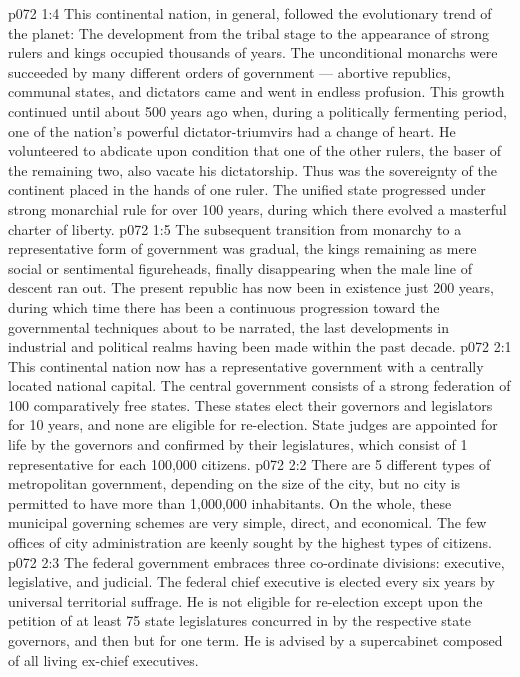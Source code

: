 \vs p072 1:4 \pc This continental nation, in general, followed the evolutionary trend of the planet: The development from the tribal stage to the appearance of strong rulers and kings occupied thousands of years. The unconditional monarchs were succeeded by many different orders of government --- abortive republics, communal states, and dictators came and went in endless profusion. This growth continued until about 500 years ago when, during a politically fermenting period, one of the nation’s powerful dictator\hyp{}triumvirs had a change of heart. He volunteered to abdicate upon condition that one of the other rulers, the baser of the remaining two, also vacate his dictatorship. Thus was the sovereignty of the continent placed in the hands of one ruler. The unified state progressed under strong monarchial rule for over 100 years, during which there evolved a masterful charter of liberty.
\vs p072 1:5 The subsequent transition from monarchy to a representative form of government was gradual, the kings remaining as mere social or sentimental figureheads, finally disappearing when the male line of descent ran out. The present republic has now been in existence just 200 years, during which time there has been a continuous progression toward the governmental techniques about to be narrated, the last developments in industrial and political realms having been made within the past decade.
\vs p072 2:1 This continental nation now has a representative government with a centrally located national capital. The central government consists of a strong federation of 100 comparatively free states. These states elect their governors and legislators for 10 years, and none are eligible for re\hyp{}election. State judges are appointed for life by the governors and confirmed by their legislatures, which consist of 1 representative for each 100,000 citizens.
\vs p072 2:2 There are 5 different types of metropolitan government, depending on the size of the city, but no city is permitted to have more than 1,000,000 inhabitants. On the whole, these municipal governing schemes are very simple, direct, and economical. The few offices of city administration are keenly sought by the highest types of citizens.
\vs p072 2:3 The federal government embraces three co\hyp{}ordinate divisions: executive, legislative, and judicial. The federal chief executive is elected every six years by universal territorial suffrage. He is not eligible for re\hyp{}election except upon the petition of at least 75 state legislatures concurred in by the respective state governors, and then but for one term. He is advised by a supercabinet composed of all living ex\hyp{}chief executives.
